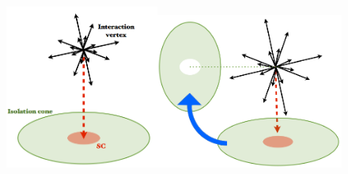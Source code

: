 \begin{figure} \label{fig-RandomConeIsolation}
\begin{center}
\includegraphics[width=0.45\textwidth]{Figures/RandomCone1.png}\includegraphics[width=0.55\textwidth]{Figures/RandomCone2.png}
\caption{}
\end{center}
\end{figure}

